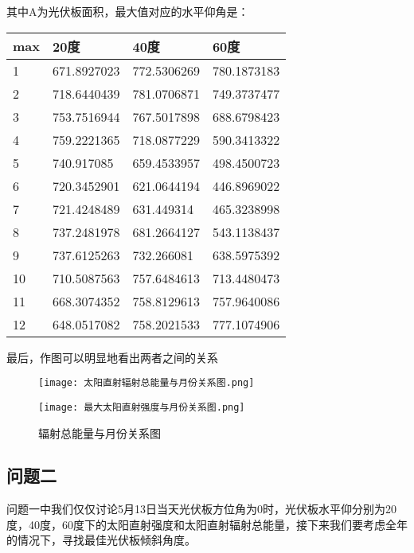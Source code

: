 \documentclass[withoutpreface,bwprint]{cumcmthesis} %
\begin{document}
其中A为光伏板面积，最大值对应的水平仰角是：
\begin{table}[!ht]
	\centering
	\begin{tabular}{|l|l|l|l|}
		\hline
		max & 20度 & 40度 & 60度  \\ \hline
		1 & 671.8927023 & 772.5306269 & 780.1873183  \\ \hline
		2 & 718.6440439 & 781.0706871 & 749.3737477  \\ \hline
		3 & 753.7516944 & 767.5017898 & 688.6798423  \\ \hline
		4 & 759.2221365 & 718.0877229 & 590.3413322  \\ \hline
		5 & 740.917085 & 659.4533957 & 498.4500723  \\ \hline
		6 & 720.3452901 & 621.0644194 & 446.8969022  \\ \hline
		7 & 721.4248489 & 631.449314 & 465.3238998  \\ \hline
		8 & 737.2481978 & 681.2664127 & 543.1138437  \\ \hline
		9 & 737.6125263 & 732.266081 & 638.5975392  \\ \hline
		10 & 710.5087563 & 757.6484613 & 713.4480473  \\ \hline
		11 & 668.3074352 & 758.8129613 & 757.9640086  \\ \hline
		12 & 648.0517082 & 758.2021533 & 777.1074906  \\ \hline
	\end{tabular}
\end{table}

最后，作图可以明显地看出两者之间的关系
\newpage
\begin{figure}
	\centering
	\begin{minipage}[c]{0.48\textwidth}
		\centering
		\texttt{[image: 太阳直射辐射总能量与月份关系图.png]}
	\end{minipage}
	\begin{minipage}[c]{0.48\textwidth}
		\centering
		\texttt{[image: 最大太阳直射强度与月份关系图.png]}
	\end{minipage}
	\caption{辐射总能量与月份关系图}
\end{figure}

\subsection{问题二}

问题一中我们仅仅讨论5月13日当天光伏板方位角为0时，光伏板水平仰分别为20度，40度，60度下的太阳直射强度和太阳直射辐射总能量，接下来我们要考虑全年的情况下，寻找最佳光伏板倾斜角度。
\end{document}
